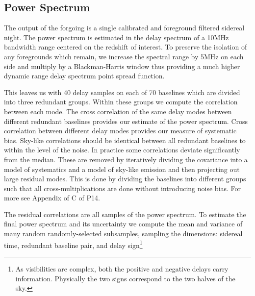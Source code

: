 \documentclass[preprint]{aastex}
\begin{document}
\subsection{Power Spectrum}
\label{sec:power_spectrum}
The output of the forgoing is a single calibrated and foreground filtered sidereal night. The power spectrum is estimated in the delay spectrum of  a 10MHz bandwidth range centered on the redshift of interest. To preserve the isolation of any foregrounds which remain, we increase the spectral range by 5MHz on each side and multiply by a Blackman-Harris window thus providing a much higher dynamic range delay spectrum point spread function. 

This leaves us with 40 delay samples on each of 70 baselines which are divided into three redundant groups. Within these groups we compute the  correlation between each mode.  The cross correlation of the same delay modes between different redundant baselines provides our estimate of the power spectrum.  Cross correlation between different delay modes provides our measure of systematic bias.  Sky-like correlations should be identical between all redundant baselines to within the level of the noise. In practice some correlations deviate significantly from the median.  These are removed by iteratively dividing the covariance into a model of systematics and a model of sky-like emission and then projecting out large residual modes. This is done by dividing the baselines into different groups such that all cross-multiplications are done without introducing noise bias.  For more see Appendix of C of P14.

The residual correlations are all samples of the power spectrum. To estimate the final power spectrum and its uncertainty we compute the mean and variance of many random randomly-selected subsamples, sampling the dimensions: sidereal time, redundant baseline pair, and delay sign\footnote{As visibilities are complex, both the positive and negative delays  carry  information. Physically the two signs correspond to the two halves of the sky.}
\end{document}

